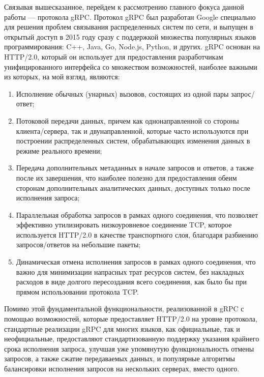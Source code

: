 \documentclass[times]{itmo-student-thesis}
\begin{document}
Связывая вышесказанное, перейдем к рассмотрению главного фокуса данной работы — протокола gRPC. Протокол gRPC был разработан Google специально для решения проблем
связывания распределенных систем по сети, и выпущен в открытый доступ в 2015 году сразу с поддержкой множества популярных языков программирования:
C++, Java, Go, Node.js, Python, и других. gRPC основан на HTTP/2.0, который он использует для предоставления разработчикам унифицированного интерфейса со множеством возможностей,
наиболее важными из которых, на мой взгляд, являются:
\begin{enumerate}
    \item Исполнение обычных (унарных) вызовов, состоящих из одной пары запрос/ответ;
    \item Потоковой передачи данных, причем как однонаправленной со стороны клиента/сервера, так и двунаправленной,
          которые часто используются при построении распределенных систем, обрабатывающих изменения данных в режиме реального времени;
    \item Передача дополнительных метаданных в начале запросов и ответов, а также после их завершения,
          что наиболее полезно для предоставления обеим сторонам дополнительных аналитических данных, доступных только после исполнения запроса;
    \item Параллельная обработка запросов в рамках одного соединения, что позволяет эффективно утилизировать низкоуровневое соединение TCP,
          которое используется HTTP/2.0 в качестве транспортного слоя, благодаря разбиению запросов/ответов на небольшие пакеты;
    \item Динамическая отмена исполнения запросов в рамках одного соединения, что важно для минимизации напрасных трат ресурсов систем,
          без накладных расходов в виде долгого пересоздания всего соединения, как было бы при прямом использовании протокола TCP. 
\end{enumerate}

Помимо этой фундаментальной функциональности, реализованной в gRPC с помощью возможностей, которые предоставляет HTTP/2.0 на уровне протокола,
стандартные реализации gRPC для многих языков, как официальные, так и неофициальные, предоставляют стандартизованную поддержку указания крайнего срока исполнения запроса,
улучшая уже упомянутую функциональность отмены запросов, а также сжатие передаваемых данных, и популярные алгоритмы балансировки исполнения запросов на нескольких серверах, вместо одного.
\end{document}
